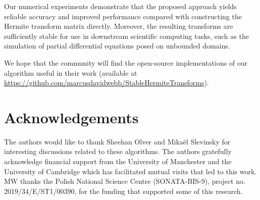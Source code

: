 \documentclass[10pt]{article}
\numberwithin{theorem}{section}
\begin{document}
Our numerical experiments demonstrate that the proposed approach yields reliable accuracy and improved performance compared with constructing the Hermite transform matrix directly. Moreover, the resulting transforms are sufficiently stable for use in downstream scientific computing tasks, such as the simulation of partial differential equations posed on unbounded domains.

We hope that the community will find the open-source implementations of our algorithm useful in their work (available at \url{https://github.com/marcusdavidwebb/StableHermiteTransforms}).

\section*{Acknowledgements}

The authors would like to thank Sheehan Olver and Mika\"el Slevinsky for interesting discussions related to these algorithms. The authors gratefully acknowledge financial support from the University of Manchester and the University of Cambridge which has facilitated mutual visits that led to this work. MW thanks the Polish National Science Centre (SONATA-BIS-9), project no. 2019/34/E/ST1/00390, for the funding that supported some of this research.



\end{document}
